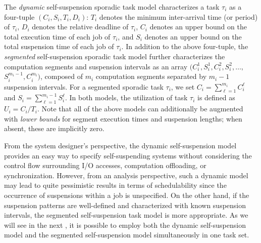 The \emph{dynamic} self-suspension sporadic task model characterizes a task $\tau_i$ as a four-tuple $(C_i,S_i,T_i,D_i)$: $T_i$ denotes the 
minimum inter-arrival time (or period) of $\tau_i$, $D_i$ denotes the relative deadline of $\tau_i$, $C_i$ denotes an upper bound on 
the total execution time of each job of $\tau_i$, and $S_i$ denotes an upper bound on the total suspension time of each job of $\tau_i$.  
In addition to the above four-tuple, the \emph{segmented} self-suspension sporadic task model further characterizes the computation segments and suspension 
intervals as an array $(C_{i}^1,S_{i}^1,C_{i}^2,S_{i}^2,\ldots, $ $S_{i}^{m_i-1},C_{i}^{m_i})$, composed of $m_i$ computation segments 
separated by $m_i-1$ suspension intervals.  For a segmented sporadic task $\tau_i$, we set 
$C_i = \sum_{\ell=1}^{m_i} C_i^\ell$ and $S_i=\sum_{\ell=1}^{m_i-1} S_i^\ell$.
In both models, the
utilization of task $\tau_i$ is defined as $U_i=C_i/T_i$.
Note that all of the above models can additionally be augmented with \emph{lower bounds} for segment execution times and suspension 
lengths; when absent, these are implicitly zero.

From the system designer's perspective, the dynamic self-suspension model provides an easy way to specify self-suspending systems 
without considering the control flow surrounding I/O accesses, computation offloading, or synchronization. However, from an analysis perspective, such a 
dynamic model may lead to quite pessimistic results in terms of schedulability since the occurrence of suspensions within a job is 
unspecified. On the other hand, if the suspension patterns are well-defined and characterized with known suspension intervals, the 
segmented self-suspension task model is more appropriate.   
As we will see in the next \mysectionrefnormal{}, it is possible to employ both the dynamic self-suspension model and the segmented self-suspension model simultaneously 
in one task set.




